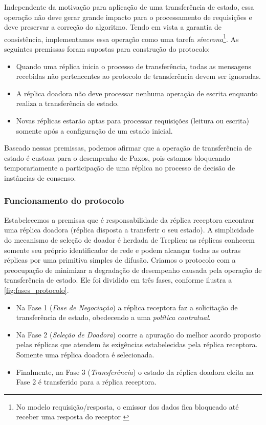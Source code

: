 Independente da motivação para aplicação de uma transferência de estado, essa operação
não deve gerar grande impacto para o processamento de requisições e deve preservar a
correção do algoritmo. Tendo em vista a garantia de consistência, implementamos essa
operação como uma tarefa \emph{síncrona}\footnote{No modelo requisição/resposta, o emissor
dos dados fica bloqueado até receber uma resposta do receptor \cite{coulouris11}}. As
seguintes premissas foram supostas para construção do protocolo:

\begin{itemize}
  \item Quando uma réplica inicia o processo de transferência, todas as mensagens
    recebidas não pertencentes ao protocolo de transferência devem ser ignoradas.
  \item A réplica doadora não deve processar nenhuma operação de escrita enquanto realiza
    a transferência de estado.
  \item Novas réplicas estarão aptas para processar requisições (leitura ou escrita)
    somente após a configuração de um estado inicial.
\end{itemize}

Baseado nessas premissas, podemos afirmar que a operação de transferência de estado é
custosa para o desempenho de Paxos, pois estamos bloqueando temporariamente a participação
de uma réplica no processo de decisão de instâncias de consenso.

\subsubsection{Funcionamento do protocolo}\label{subsec:funcionamento_protocolo}

Estabelecemos a premissa que é responsabilidade da réplica receptora encontrar uma réplica
doadora (réplica disposta a transferir o seu estado). A simplicidade do mecanismo de
seleção de doador é herdada de Treplica: as réplicas conhecem somente seu próprio
identificador de rede e podem alcançar todas as outras réplicas por uma primitiva simples
de difusão. Criamos o protocolo com a preocupação de minimizar a degradação de desempenho
causada pela operação de transferência de estado. Ele foi dividido em três fases, conforme
ilustra a \autoref{fig:fases_protocolo}.

\begin{itemize}
  \item Na Fase 1 (\emph{Fase de Negociação}) a réplica receptora faz a solicitação de
    transferência de estado, obedecendo a uma \emph{política contratual}.
  \item Na Fase 2 (\emph{Seleção de Doadora}) ocorre a apuração do melhor acordo proposto
    pelas réplicas que atendem às exigências estabelecidas pela réplica receptora. Somente
    uma réplica doadora é selecionada.
  \item Finalmente, na Fase 3 (\emph{Transferência}) o estado da réplica doadora eleita na
    Fase 2 é transferido para a réplica receptora.
\end{itemize}

